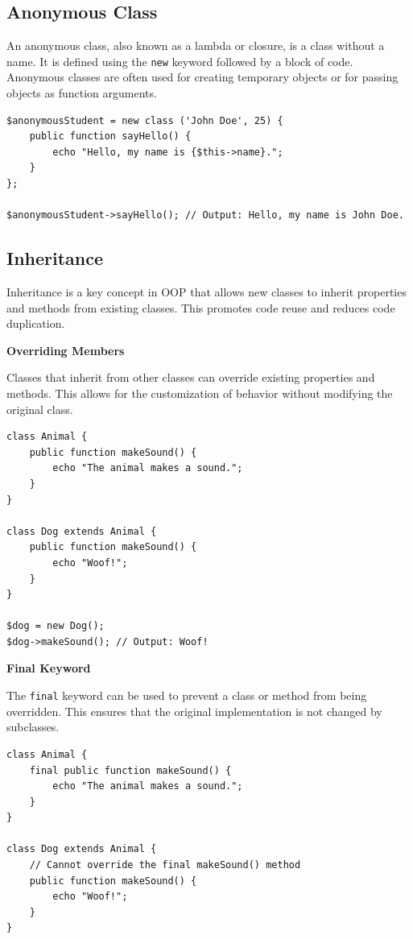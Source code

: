 \documentclass[11pt]{article}
\begin{document}
\subsection{\textbf{Anonymous Class}}
\label{sec:org059b149}
An anonymous class, also known as a lambda or closure, is a class
without a name. It is defined using the \texttt{new} keyword followed by a
block of code. Anonymous classes are often used for creating temporary
objects or for passing objects as function arguments.

\begin{verbatim}
$anonymousStudent = new class ('John Doe', 25) {
    public function sayHello() {
        echo "Hello, my name is {$this->name}.";
    }
};

$anonymousStudent->sayHello(); // Output: Hello, my name is John Doe.
\end{verbatim}

\subsection{\textbf{Inheritance}}
\label{sec:org5820731}
Inheritance is a key concept in OOP that allows new classes to inherit
properties and methods from existing classes. This promotes code reuse
and reduces code duplication.

\textbf{Overriding Members}

Classes that inherit from other classes can override existing properties
and methods. This allows for the customization of behavior without
modifying the original class.

\begin{verbatim}
class Animal {
    public function makeSound() {
        echo "The animal makes a sound.";
    }
}

class Dog extends Animal {
    public function makeSound() {
        echo "Woof!";
    }
}

$dog = new Dog();
$dog->makeSound(); // Output: Woof!
\end{verbatim}

\textbf{Final Keyword}

The \texttt{final} keyword can be used to prevent a class or method from being
overridden. This ensures that the original implementation is not changed
by subclasses.

\begin{verbatim}
class Animal {
    final public function makeSound() {
        echo "The animal makes a sound.";
    }
}

class Dog extends Animal {
    // Cannot override the final makeSound() method
    public function makeSound() {
        echo "Woof!";
    }
}
\end{verbatim}
\end{document}
